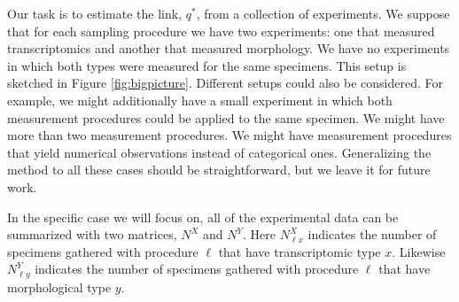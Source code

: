 Our task is to estimate the link, $q^*$, from a collection of experiments.  We suppose that for each sampling procedure we have two experiments: one that measured transcriptomics and another that measured morphology.  We have no experiments in which both types were measured for the same specimens.  This setup is sketched in Figure \ref{fig:bigpicture}.  Different setups could also be considered.   For example, we might additionally have a small experiment in which both measurement procedures could be applied to the same specimen.  We might have more than two measurement procedures.  We might have measurement procedures that yield numerical observations instead of categorical ones.  Generalizing the method to all these cases should be straightforward, but we leave it for future work.  

In the specific case we will focus on, all of the experimental data can be summarized with two matrices, $N^X$ and $N^Y$.  Here $N^X_{\ell x}$ indicates the number of specimens gathered with procedure $\ell$ that have transcriptomic type $x$.  Likewise $N^Y_{\ell y}$ indicates the number of specimens gathered with procedure $\ell$ that have morphological type $y$.  

